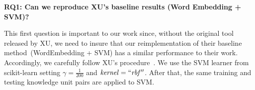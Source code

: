 \documentclass[sigconf,review, anonymous]{acmart}
\theoremstyle{break}
\begin{document}

\textbf{RQ1: Can we reproduce XU's baseline results (Word Embedding + SVM)?}
 
 


This first question   is    important to our work since, without the original tool released by XU,
we need to insure that  our reimplementation of their baseline method~(WordEmbedding + SVM) has a similar performance to their work.
Accordingly, we carefully follow XU's procedure~\cite{xu2016predicting}. We 
use the SVM learner from scikit-learn setting $\gamma = \frac{1}{200}$ and $\mathit{kernel=``rbf''} $. After that, the same training and testing knowledge unit pairs are applied to SVM.
\end{document}
